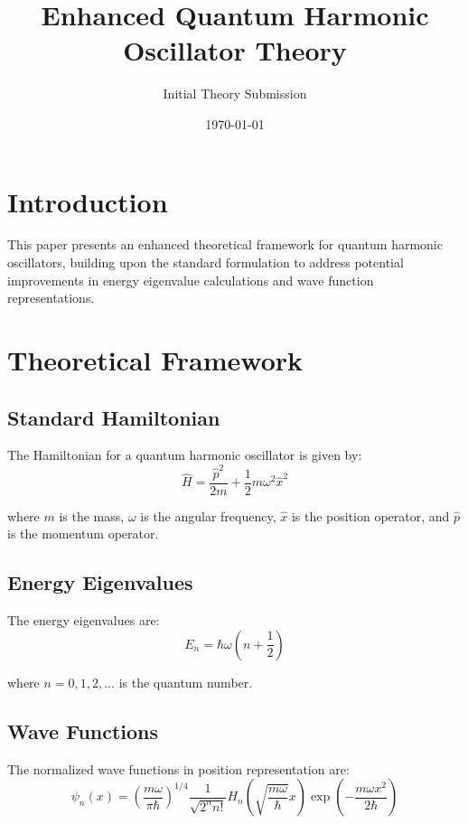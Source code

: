 \documentclass{article}
\title{Enhanced Quantum Harmonic Oscillator Theory}
\author{Initial Theory Submission}
\date{\today}
\begin{document}
\maketitle

\section{Introduction}
This paper presents an enhanced theoretical framework for quantum harmonic oscillators, building upon the standard formulation to address potential improvements in energy eigenvalue calculations and wave function representations.

\section{Theoretical Framework}

\subsection{Standard Hamiltonian}
The Hamiltonian for a quantum harmonic oscillator is given by:
\begin{equation}
\hat{H} = \frac{\hat{p}^2}{2m} + \frac{1}{2}m\omega^2\hat{x}^2
\end{equation}

where $m$ is the mass, $\omega$ is the angular frequency, $\hat{x}$ is the position operator, and $\hat{p}$ is the momentum operator.

\subsection{Energy Eigenvalues}
The energy eigenvalues are:
\begin{equation}
E_n = \hbar\omega\left(n + \frac{1}{2}\right)
\end{equation}

where $n = 0, 1, 2, \ldots$ is the quantum number.

\subsection{Wave Functions}
The normalized wave functions in position representation are:
\begin{equation}
\psi_n(x) = \left(\frac{m\omega}{\pi\hbar}\right)^{1/4} \frac{1}{\sqrt{2^n n!}} H_n\left(\sqrt{\frac{m\omega}{\hbar}}x\right) \exp\left(-\frac{m\omega x^2}{2\hbar}\right)
\end{equation}
\end{document}
